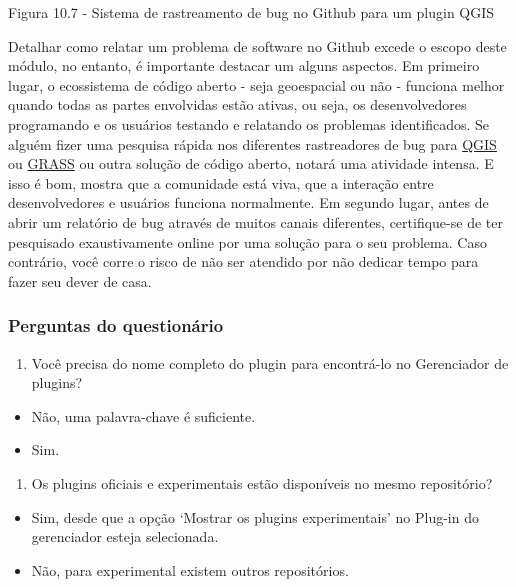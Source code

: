 \documentclass[
]{book}
\providecommand{\tightlist}{%
  \setlength{\itemsep}{0pt}\setlength{\parskip}{0pt}}
\begin{document}
Figura 10.7 - Sistema de rastreamento de bug no Github para um plugin QGIS

Detalhar como relatar um problema de software no Github excede o escopo deste módulo, no entanto, é importante destacar um alguns aspectos. Em primeiro lugar, o ecossistema de código aberto - seja geoespacial ou não - funciona melhor quando todas as partes envolvidas estão ativas, ou seja, os desenvolvedores programando e os usuários testando e relatando os problemas identificados. Se alguém fizer uma pesquisa rápida nos diferentes rastreadores de bug para \href{https://github.com/qgis/QGIS/issues}{QGIS} ou \href{https://github.com/OSGeo/grass/issues}{GRASS} ou outra solução de código aberto, notará uma atividade intensa. E isso é bom, mostra que a comunidade está viva, que a interação entre desenvolvedores e usuários funciona normalmente. Em segundo lugar, antes de abrir um relatório de bug através de muitos canais diferentes, certifique-se de ter pesquisado exaustivamente online por uma solução para o seu problema. Caso contrário, você corre o risco de não ser atendido por não dedicar tempo para fazer seu dever de casa.

\hypertarget{perguntas-do-questionuxe1rio-21}{%
\subsubsection{\texorpdfstring{\textbf{Perguntas do questionário}}{Perguntas do questionário}}\label{perguntas-do-questionuxe1rio-21}}

\begin{enumerate}
\def\labelenumi{\arabic{enumi}.}
\tightlist
\item
  Você precisa do nome completo do plugin para encontrá-lo no Gerenciador de plugins?
\end{enumerate}

\begin{itemize}
\tightlist
\item
  { Não, uma palavra-chave é suficiente. }
\item
  Sim.
\end{itemize}

\begin{enumerate}
\def\labelenumi{\arabic{enumi}.}
\setcounter{enumi}{1}
\tightlist
\item
  Os plugins oficiais e experimentais estão disponíveis no mesmo repositório?
\end{enumerate}

\begin{itemize}
\tightlist
\item
  { Sim, desde que a opção `Mostrar os plugins experimentais' no Plug-in do gerenciador esteja selecionada. }
\item
  Não, para experimental existem outros repositórios.
\end{itemize}
\end{document}
